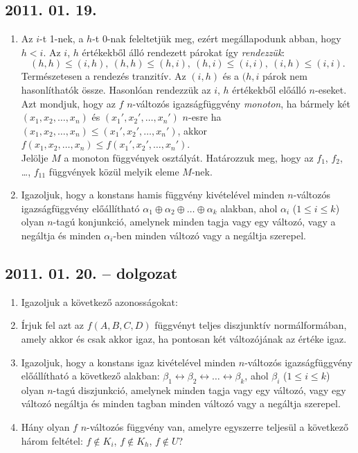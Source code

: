 \subsection*{2011. 01. 19.}
\begin{enumerate}
\item Az $i$-t 1-nek, a $h$-t 0-nak feleltetjük meg, ezért megállapodunk abban, hogy $h<i$. Az $i$, $h$ értékekből álló rendezett párokat így \emph{rendezzük}:
\[(h,h)\le(i,h),~(h,h)\le(h,i),~(h,i)\le(i,i),~(i,h)\le(i,i).\]
Természetesen a rendezés tranzitív. Az $(i,h)$ és a $(h,i$ párok nem hasonlíthatók össze. Hasonlóan rendezzük az $i$, $h$ értékekből előálló $n$-eseket.\\
Azt mondjuk, hogy az $f$ $n$-változós igazságfüggvény \emph{monoton}, ha bármely két $\left(x_1, x_2, \ldots, x_n\right)$ és $\left(x_1', x_2', \ldots, x_n'\right)$ $n$-esre ha $\left(x_1, x_2, \ldots, x_n\right)\le\left(x_1', x_2', \ldots, x_n'\right)$, akkor $f\left(x_1, x_2, \ldots, x_n\right)\le f\left(x_1', x_2', \ldots, x_n'\right)$.\\
Jelölje $M$ a monoton függvények osztályát. Határozzuk meg, hogy az $f_1$, $f_2$, \ldots, $f_{11}$ függvények közül melyik eleme $M$-nek.
\item Igazoljuk, hogy a konstans hamis függvény kivételével minden $n$-változós igazságfüggvény előállítható $\alpha_1\oplus\alpha_2\oplus\ldots\oplus\alpha_k$ alakban, ahol $\alpha_i$ ($1\le i\le k$) olyan $n$-tagú konjunkció, amelynek minden tagja vagy egy változó, vagy a negáltja és minden $\alpha_i$-ben minden változó vagy a negáltja szerepel.
\end{enumerate}

\subsection*{2011. 01. 20. -- dolgozat}
\begin{enumerate}
\item Igazoljuk a következő azonosságokat:
\item Írjuk fel azt az $f(A, B, C, D)$ függvényt teljes diszjunktív normálformában, amely akkor és csak akkor igaz, ha pontosan két változójának az értéke igaz.
\item Igazoljuk, hogy a konstans igaz kivételével minden $n$-változós igazságfüggvény előállítható a következő alakban: $\beta_1\leftrightarrow\beta_2\leftrightarrow\ldots\leftrightarrow\beta_k$, ahol $\beta_i$ ($1\le i\le k$) olyan $n$-tagú diszjunkció, amelynek minden tagja vagy egy változó, vagy egy változó negáltja és minden tagban minden változó vagy a negáltja szerepel.
\item Hány olyan $f$ $n$-változós függvény van, amelyre egyszerre teljesül a következő három feltétel: $f\notin K_i$, $f\notin K_h$, $f\notin U$?

\end{enumerate}


